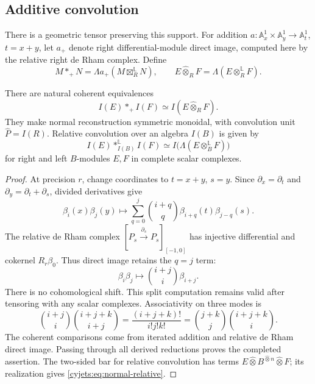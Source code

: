 \subsection{Additive convolution}

There is a geometric tensor preserving this support. For addition
$a:\mathbb A_x^1\times\mathbb A_y^1\to\mathbb A_t^1$,
$t=x+y$, let $a_+$ denote right differential-module direct image,
computed here by the relative right de Rham complex. Define
\[
 M*_+N=\Lambda a_+(M\boxtimes_R^{\mathbb L}N),\qquad
 E\widehat\otimes_R F=\Lambda(E\otimes_R^{\mathbb L}F).
\]

\begin{proposition}\label{cyjets:prop:normal-convolution}
There are natural coherent equivalences
\[
 I(E)*_+I(F)\simeq I(E\widehat\otimes_R F).
\]
They make normal reconstruction symmetric monoidal, with convolution
unit $\widehat P=I(R)$. Relative convolution over an algebra $I(B)$
is given by
\begin{equation}\label{cyjets:eq:normal-relative}
 I(E)*_{I(B)}^{\mathbb L}I(F)
       \simeq I\bigl(\Lambda(E\otimes_B^{\mathbb L}F)\bigr)
\end{equation}
for right and left $B$-modules $E,F$ in complete scalar complexes.
\end{proposition}
\begin{proof}
At precision $r$, change coordinates to $t=x+y$, $s=y$.
Since $\partial_x=\partial_t$ and
$\partial_y=\partial_t+\partial_s$, divided derivatives give
\[
 \beta_i(x)\beta_j(y)\longmapsto
 \sum_{q=0}^j\binom{i+q}{q}\beta_{i+q}(t)\beta_{j-q}(s).
\]
The relative de Rham complex
$[P_s\xrightarrow{\partial_s}P_s]_{[-1,0]}$ has injective
differential and cokernel $R_r\beta_0$. Thus direct image retains
the $q=j$ term:
\begin{equation}\label{cyjets:eq:normal-binomial}
 \beta_i\beta_j\longmapsto\binom{i+j}{i}\beta_{i+j}.
\end{equation}
There is no cohomological shift. This split computation remains
valid after tensoring with any scalar complexes. Associativity
on three modes is
\[
 \binom{i+j}{i}\binom{i+j+k}{i+j}
 =\frac{(i+j+k)!}{i!j!k!}
 =\binom{j+k}{j}\binom{i+j+k}{i}.
\]
The coherent comparisons come from iterated addition and relative
de Rham direct image. Passing through all derived reductions proves
the completed assertion. The two-sided bar for relative convolution
has terms $E\widehat\otimes B^{\widehat\otimes n}
\widehat\otimes F$; its realization gives
\eqref{cyjets:eq:normal-relative}.
\end{proof}

